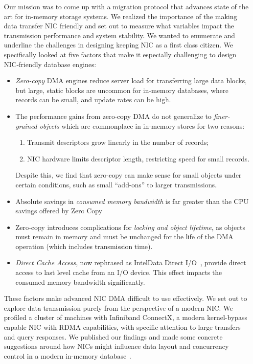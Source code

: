 Our mission was to come up with a migration protocol that advances state of the art for in-memory storage systems.
We realized the importance of the making data transfer NIC friendly and set out to measure what variables impact the 
transmission performance and system stability. We wanted to enumerate and underline the challenges in designing keeping NIC as a first class citizen.
We specifically looked at five factors that make it especially challenging to design NIC-friendly
database engines:
\begin{itemize}
  \item {\em Zero-copy} DMA engines reduce server load for transferring large data
    blocks, but large, static blocks are uncommon for in-memory databases,
    where records can be small, and update rates can be high.
  \item The performance gains from zero-copy DMA do not generalize to
      {\em finer-grained objects} which are commonplace in in-memory stores for two reasons:
      \begin{enumerate}
        \item Transmit descriptors grow linearly in the number of records;
        \item NIC hardware limits descriptor length, restricting speed for small records.
      \end{enumerate}
      Despite this, we find that zero-copy can make sense for small objects under certain conditions, such as
      small ``add-ons'' to larger transmissions.
   \item Absolute savings in {\em consumed memory bandwidth} is far greater than the CPU savings 
       offered by Zero Copy
   \item Zero-copy introduces complications for \emph{locking and object
      lifetime}, as objects must remain in memory and must be
      unchanged for the life of the DMA operation (which includes transmission
      time).
  \item {\em Direct Cache Access}, now rephrased as Intel\textregistered Data Direct I/O~\cite{ddio},
      provide direct access to last level cache from an I/O device. This effect
      impacts the consumed memory bandwidth significantly.
\end{itemize}


These factors make advanced NIC DMA difficult to use effectively. We set out to explore data 
transmission purely from the perspective of a modern NIC. We profiled a cluster of machines with
Infiniband ConnectX, a modern kernel-bypass capable NIC
with RDMA capabilities, with specific attention to large transfers and query responses.
We published our findings and made some concrete suggestions around how NICs might
influence data layout and concurrency control in a modern in-memory 
database~\cite{imdmpaper}. 

